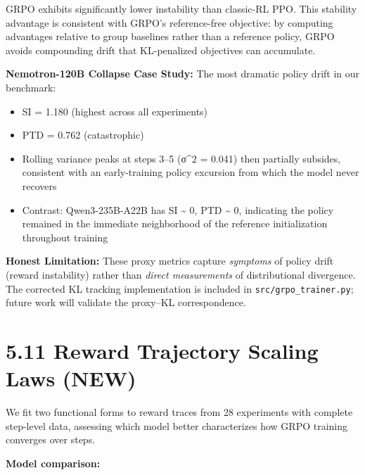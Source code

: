 \documentclass[
  american,
  11pt,
  a4paper,
  oneside]{report}
\providecommand{\tightlist}{%
  \setlength{\itemsep}{0pt}\setlength{\parskip}{0pt}}
\begin{document}
GRPO exhibits significantly lower instability than classic-RL PPO. This
stability advantage is consistent with GRPO's reference-free objective:
by computing advantages relative to group baselines rather than a
reference policy, GRPO avoids compounding drift that KL-penalized
objectives can accumulate.

\textbf{Nemotron-120B Collapse Case Study:} The most dramatic policy
drift in our benchmark:

\begin{itemize}
\tightlist
\item
  SI = 1.180 (highest across all experiments)
\item
  PTD = 0.762 (catastrophic)
\item
  Rolling variance peaks at steps 3--5 (σ\^{}2 = 0.041) then partially
  subsides, consistent with an early-training policy excursion from
  which the model never recovers
\item
  Contrast: Qwen3-235B-A22B has SI \textasciitilde{} 0, PTD
  \textasciitilde{} 0, indicating the policy remained in the immediate
  neighborhood of the reference initialization throughout training
\end{itemize}

\textbf{Honest Limitation:} These proxy metrics capture \emph{symptoms}
of policy drift (reward instability) rather than \emph{direct
measurements} of distributional divergence. The corrected KL tracking
implementation is included in \texttt{src/grpo\_trainer.py}; future work
will validate the proxy--KL correspondence.

\section{5.11 Reward Trajectory Scaling Laws
(NEW)}\label{reward-trajectory-scaling-laws-new}

We fit two functional forms to reward traces from 28 experiments with
complete step-level data, assessing which model better characterizes how
GRPO training converges over steps.

\textbf{Model comparison:}
\end{document}
